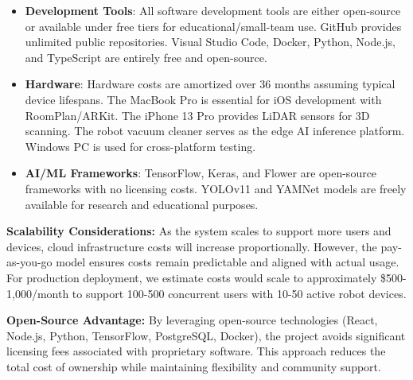 \documentclass[conference]{IEEEtran}
\begin{document}
\begin{enumerate}
\begin{itemize}
    \item \textbf{Development Tools}: All software development tools are either open-source or available under free tiers for educational/small-team use. GitHub provides unlimited public repositories. Visual Studio Code, Docker, Python, Node.js, and TypeScript are entirely free and open-source.

    \item \textbf{Hardware}: Hardware costs are amortized over 36 months assuming typical device lifespans. The MacBook Pro is essential for iOS development with RoomPlan/ARKit. The iPhone 13 Pro provides LiDAR sensors for 3D scanning. The robot vacuum cleaner serves as the edge AI inference platform. Windows PC is used for cross-platform testing.

    \item \textbf{AI/ML Frameworks}: TensorFlow, Keras, and Flower are open-source frameworks with no licensing costs. YOLOv11 and YAMNet models are freely available for research and educational purposes.
\end{itemize}

\textbf{Scalability Considerations:}
As the system scales to support more users and devices, cloud infrastructure costs will increase proportionally. However, the pay-as-you-go model ensures costs remain predictable and aligned with actual usage. For production deployment, we estimate costs would scale to approximately \$500-1,000/month to support 100-500 concurrent users with 10-50 active robot devices.

\textbf{Open-Source Advantage:}
By leveraging open-source technologies (React, Node.js, Python, TensorFlow, PostgreSQL, Docker), the project avoids significant licensing fees associated with proprietary software. This approach reduces the total cost of ownership while maintaining flexibility and community support.

\end{enumerate}
\end{document}
